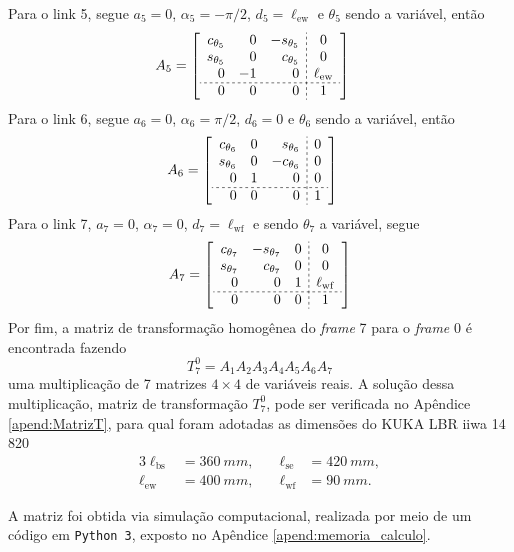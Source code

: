Para o link 5, segue $a_5 = 0$, $\alpha_5 = -\pi/2$, $d_5=\ell_\mathrm{ew}$ e $\theta_5$ sendo a variável, então
\begin{align*}
    A_5 &=
    \left[ 
    \begin{array}{rrr;{2pt/2pt}c}
        c_{\theta_5} & 0 & -s_{\theta_5} & 0 \\
        s_{\theta_5} & 0 &  c_{\theta_5} & 0 \\
        0 & -1 & 0 &  \ell_\mathrm{ew} \\
        \hdashline[2pt/2pt]
        0 & 0 & 0 & 1
    \end{array}
    \right]
\end{align*}
Para o link 6, segue $a_6 = 0$, $\alpha_6 = \pi/2$, $d_6=0$ e $\theta_6$ sendo a variável, então
\begin{align*}
    A_6 &=
    \left[ 
    \begin{array}{rrr;{2pt/2pt}c}
        c_{\theta_6} & 0 &  s_{\theta_6} & 0 \\
        s_{\theta_6} & 0 & -c_{\theta_6} & 0 \\
        0 & 1 & 0 &  0 \\
        \hdashline[2pt/2pt]
        0 & 0 & 0 & 1
    \end{array}
    \right]
\end{align*}
Para o link 7, $a_7 = 0$, $\alpha_7 = 0$, $d_7=\ell_\mathrm{wf}$ e sendo $\theta_7$ a variável, segue
    \begin{align*}
        A_7 =
        \left[ 
    \begin{array}{rrr;{2pt/2pt}c}
        c_{\theta_7} & -s_{\theta_7} & 0 & 0 \\
        s_{\theta_7} &  c_{\theta_7} & 0 & 0 \\
        0 & 0 & 1 & \ell_\mathrm{wf} \\
        \hdashline[2pt/2pt]
        0 & 0 & 0 & 1
    \end{array}
    \right]
    \end{align*}
    Por fim, a matriz de transformação homogênea do \textit{frame} 7 para o \textit{frame} 0 é encontrada fazendo
    \begin{equation}
        T_7^0 = A_1 A_2 A_3 A_4 A_5 A_6 A_7
    \end{equation}
uma multiplicação de 7 matrizes $4\times4$ de variáveis reais. A solução dessa multiplicação, matriz de transformação $T_7^0$, pode ser verificada no Apêndice \ref{apend:MatrizT}, para qual foram adotadas as dimensões do KUKA LBR iiwa 14 820
\begin{alignat*}{3}
\ell_\mathrm{bs} &= \SI{360}{mm}, \quad& \ell_\mathrm{se} &= \SI{420}{mm}, \\
\ell_\mathrm{ew} &= \SI{400}{mm}, \quad & \ell_\mathrm{wf} &= \SI{90}{mm}.
\end{alignat*}

A matriz foi obtida via simulação computacional, realizada por meio de um código em \texttt{Python 3}, exposto no Apêndice \ref{apend:memoria_calculo}.